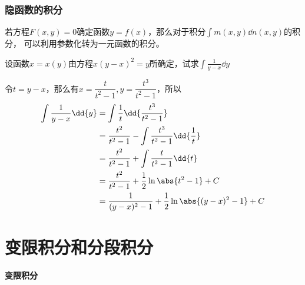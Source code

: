 \subsubsection{隐函数的积分}
若方程$F(x,y)=0$确定函数$y=f(x)$，那么对于积分$\displaystyle\int m(x,y)\dd{n(x,y)}$的积分，
可以利用参数化转为一元函数的积分。
\begin{example}
    设函数$x=x(y)$由方程$x(y-x)^2=y$所确定，试求$\displaystyle\int\frac{1}{y-x}\dd{y}$
\end{example}
\begin{solution}
    令$t=y-x$，那么有$x = \dfrac{t}{t^2-1},y = \dfrac{t^3}{t^2-1}$，所以
    \begin{align*}
        \int\frac{1}{y-x}\dd{y}
         & = \int\frac{1}{t}\dd{\frac{t^3}{t^2-1}}                      \\
         & = \frac{t^2}{t^2-1} - \int \frac{t^3}{t^2-1}\dd{\frac{1}{t}} \\
         & = \frac{t^2}{t^2-1} + \int \frac{t}{t^2-1}\dd{t}             \\
         & = \frac{t^2}{t^2-1} + \frac{1}{2}\ln\abs{t^2-1} + C          \\
         & = \frac{1}{(y-x)^2-1} + \frac{1}{2}\ln\abs{(y-x)^2-1} + C    \\
    \end{align*}
\end{solution}

\section{变限积分和分段积分}
\paragraph{变限积分}

